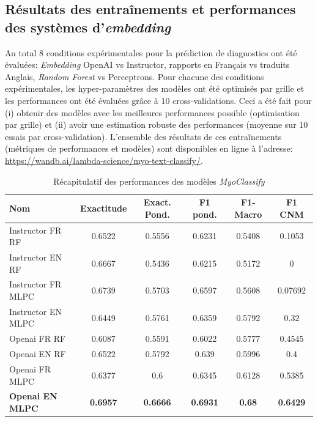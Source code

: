 \subsection{Résultats des entraînements et performances des systèmes d'\textit{embedding}}
Au total 8 conditions expérimentales pour la prédiction de diagnostics ont été évaluées: \textit{Embedding} OpenAI vs Instructor, rapports en Français vs traduits Anglais, \textit{Random Forest} vs Perceptrons. Pour chacune des conditions expérimentales, les hyper-paramètres des modèles ont été optimisés par grille et les performances ont été évaluées grâce à 10 cross-validations. Ceci a été fait pour (i) obtenir des modèles avec les meilleures performances possible (optimisation par grille) et (ii) avoir une estimation robuste des performances (moyenne sur 10 essais par cross-validation). L'ensemble des résultats de ces entraînements (métriques de performances et modèles) sont disponibles en ligne à l'adresse: \href{https://wandb.ai/lambda-science/myo-text-classify/}{https://wandb.ai/lambda-science/myo-text-classify/}. 
\begin{table}[htbp]
\centering
\caption{Récapitulatif des performances des modèles \textit{MyoClassify}}
\label{tab:myoclassify_metrics}
\begin{tabularx}{\textwidth}{|X|c|c|c|c|c|}
\hline
\textbf{Nom} & \textbf{Exactitude} & \textbf{Exact. Pond.} & \textbf{F1 pond.} & \textbf{F1-Macro} & \textbf{F1 CNM} \\\hline
Instructor FR RF & 0.6522 & 0.5556 & 0.6231 & 0.5408 & 0.1053 \\ \hline
Instructor EN RF & 0.6667 & 0.5436 & 0.6215 & 0.5172 & 0 \\ \hline
Instructor FR MLPC & 0.6739 & 0.5703 & 0.6597 & 0.5608 & 0.07692 \\ \hline
Instructor EN MLPC & 0.6449 & 0.5761 & 0.6359 & 0.5792 & 0.32 \\ \hline
Openai FR RF & 0.6087 & 0.5591 & 0.6022 & 0.5777 & 0.4545 \\ \hline
Openai EN RF & 0.6522 & 0.5792 & 0.639 & 0.5996 & 0.4 \\ \hline
Openai FR MLPC & 0.6377 & 0.6 & 0.6345 & 0.6128 & 0.5385 \\ \hline
\textbf{Openai EN MLPC} & \textbf{0.6957} &\textbf{0.6666}& \textbf{0.6931} &\textbf{ 0.68} & \textbf{0.6429} \\ \hline
\end{tabularx}
\end{table}
